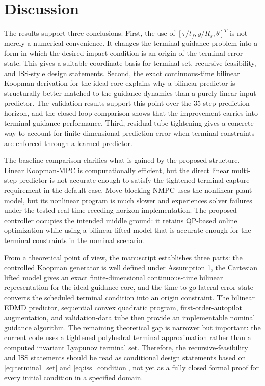 \documentclass[letterpaper,journal]{IEEEtran}
\begin{document}
\section{Discussion}
The results support three conclusions. First, the use of $[\tau/t_f,y/R_s,\theta]^T$ is not merely a numerical convenience. It changes the terminal guidance problem into a form in which the desired impact condition is an origin of the terminal error state. This gives a suitable coordinate basis for terminal-set, recursive-feasibility, and ISS-style design statements. Second, the exact continuous-time bilinear Koopman derivation for the ideal core explains why a bilinear predictor is structurally better matched to the guidance dynamics than a purely linear input predictor. The validation results support this point over the 35-step prediction horizon, and the closed-loop comparison shows that the improvement carries into terminal guidance performance. Third, residual-tube tightening gives a concrete way to account for finite-dimensional prediction error when terminal constraints are enforced through a learned predictor.

The baseline comparison clarifies what is gained by the proposed structure. Linear Koopman-MPC is computationally efficient, but the direct linear multi-step predictor is not accurate enough to satisfy the tightened terminal capture requirement in the default case. Move-blocking NMPC uses the nonlinear plant model, but its nonlinear program is much slower and experiences solver failures under the tested real-time receding-horizon implementation. The proposed controller occupies the intended middle ground: it retains QP-based online optimization while using a bilinear lifted model that is accurate enough for the terminal constraints in the nominal scenario.

From a theoretical point of view, the manuscript establishes three parts: the controlled Koopman generator is well defined under Assumption 1, the Cartesian lifted model gives an exact finite-dimensional continuous-time bilinear representation for the ideal guidance core, and the time-to-go lateral-error state converts the scheduled terminal condition into an origin constraint. The bilinear EDMD predictor, sequential convex quadratic program, first-order-autopilot augmentation, and validation-data tube then provide an implementable nominal guidance algorithm. The remaining theoretical gap is narrower but important: the current code uses a tightened polyhedral terminal approximation rather than a computed invariant Lyapunov terminal set. Therefore, the recursive-feasibility and ISS statements should be read as conditional design statements based on \eqref{eq:terminal_set} and \eqref{eq:iss_condition}, not yet as a fully closed formal proof for every initial condition in a specified domain.
\end{document}
